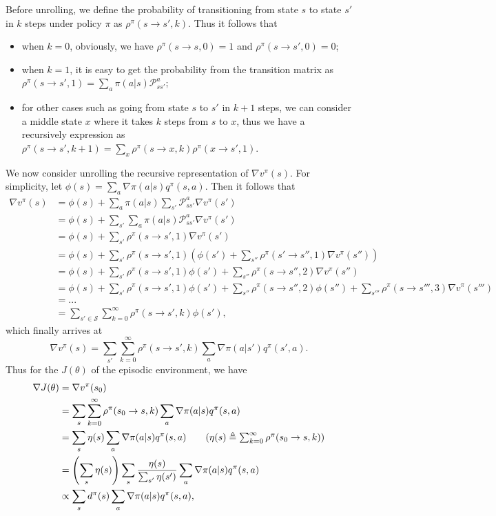 \documentclass{progartcn}
\begin{document}
		Before unrolling, we define the probability of transitioning from state $s$ to state $s'$ in $k$ steps under policy $\pi$ as $\rho^\pi(s\to s',k)$. Thus it follows that 
		\begin{itemize}[noitemsep,topsep=0pt]
			\item when $k=0$, obviously, we have $\rho^\pi(s\to s,0)=1$ and $\rho^\pi(s\to s',0)=0$;
			\item when $k=1$, it is easy to get the probability from the transition matrix as $\rho^\pi(s\to s',1)=\sum_a\pi(a|s)\mathcal{P}_{ss'}^a$;
			\item for other cases such as going from state $s$ to $s'$ in $k+1$ steps, we can consider a middle state $x$ where it takes $k$ steps from $s$ to $x$, thus we have a recursively expression as $\rho^\pi(s\to s', k+1)=\sum_{x}\rho^\pi(s\to x, k)\rho^\pi(x\to s', 1)$.
		\end{itemize}
		We now consider unrolling the recursive representation of $\nabla v^\pi(s)$. For simplicity, let $\phi(s)=\sum_a \nabla \pi(a|s)q^\pi(s,a)$. Then it follows that
		\begin{align*}
		\nabla v^\pi(s)&=\phi(s)+\sum_a\pi(a|s)\sum_{s'}\mathcal{P}_{ss'}^a\nabla v^\pi(s')\\
		&=\phi(s)+\sum_{s'}\sum_a\pi(a|s)\mathcal{P}_{ss'}^a\nabla v^\pi(s')\tag{\(\pi(a|s)\) is irrevalent to \(s'\)}\\
		&=\phi(s)+\sum_{s'}\rho^\pi(s\to s', 1)\nabla v^\pi(s')\\
		&=\phi(s)+\sum_{s'}\rho^\pi(s\to s', 1)\left(\phi(s')+\sum_{s''}\rho^\pi(s'\to s'',1)\nabla v^\pi(s'')\right)\\
		&=\phi(s)+\sum_{s'}\rho^\pi(s\to s', 1)\phi(s') + \sum_{s''}\rho^\pi(s\to s'',2)\nabla v^\pi(s'')\\
		&=\phi(s)+\sum_{s'}\rho^\pi(s\to s', 1)\phi(s') + \sum_{s''}\rho^\pi(s\to s'',2)\phi(s'') + \sum_{s'''}\rho^\pi(s\to s''',3)\nabla v^\pi(s''')\\
		&=...\\
		&=\sum_{s'\in\mathcal{S}}\sum_{k=0}^\infty \rho^\pi(s\to s', k)\phi(s'),
		\end{align*}
		which finally arrives at
		\[\nabla v^\pi(s)=\sum_{s'}\sum_{k=0}^\infty \rho^\pi(s\to s',k)\sum_a \nabla \pi(a|s')q^\pi(s',a).\]
		Thus for the $J(\theta)$ of the episodic environment, we have
		\begin{align*}
		\nabla J(\theta)&=\nabla v^\pi(s_0)\\
		&=\sum_{s}\sum_{k=0}^\infty \rho^\pi(s_0\to s, k)\sum_a \nabla \pi(a|s)q^\pi(s,a)\\
		&=\sum_{s}\eta(s)\sum_a \nabla \pi(a|s)q^\pi(s,a)\tag{$\eta(s)\triangleq\sum_{k=0}^\infty \rho^\pi(s_0\to s, k)$}\\
		&=\left(\sum_{s}\eta(s)\right)\sum_s\frac{\eta(s)}{\sum_{s'}\eta(s')}\sum_a \nabla \pi(a|s)q^\pi(s,a)\\
		&\propto\sum_s d^\pi(s)\sum_a \nabla \pi(a|s)q^\pi(s,a),
		\end{align*}
\end{document}
